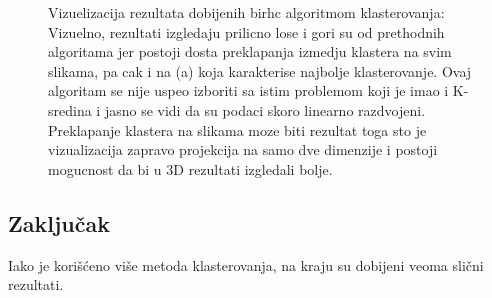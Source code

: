\documentclass{article}
\begin{document}
\begin{figure}[H]
    \centering
    \caption{ Vizuelizacija rezultata dobijenih birhc algoritmom klasterovanja: Vizuelno, rezultati izgledaju prilicno lose i gori su od prethodnih algoritama jer postoji dosta preklapanja izmedju klastera na svim slikama, pa cak i na (a) koja karakterise najbolje klasterovanje. Ovaj algoritam se nije uspeo izboriti sa istim problemom koji je imao i K-sredina i jasno se vidi da su podaci skoro linearno razdvojeni. Preklapanje klastera na slikama moze biti rezultat toga sto je vizualizacija zapravo projekcija na samo dve dimenzije i postoji mogucnost da bi u 3D rezultati izgledali bolje. }
    \label{fig:best_birch}
\end{figure}

\subsection{Zaključak}

Iako je korišćeno više metoda klasterovanja, na kraju su dobijeni veoma slični rezultati. 


  

\end{document}
